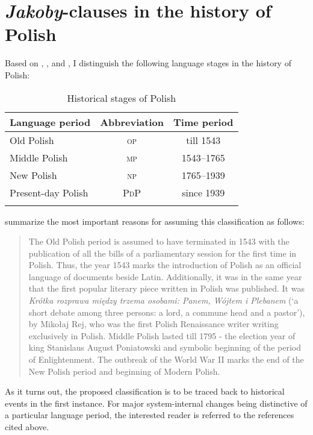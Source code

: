 \documentclass[output=paper
,modfonts
,nonflat]{langsci/langscibook}
\begin{document}
\section{\emph{Jakoby}-clauses in the history of Polish} \label{diachrony} 

Based on \textcite{Klemensiewicz2009}, \textcite{Walczak1999}, and \textcite{Dziubalska-Koaczyk-Walczak2010}, I distinguish the following language stages in the history of Polish: 


\begin{table}[h]
\begin{tabular}{lcc} 
\lsptoprule
Language period & Abbreviation & Time period  \\
\midrule
 Old Polish & \textsc{op} & till 1543 \\
 Middle Polish & \textsc{mp} & 1543--1765  \\
 New Polish & \textsc{np} & 1765--1939 \\
 Present-day Polish & \textsc{PdP} & since 1939 \\ 
\lspbottomrule
\end{tabular}
\caption{Historical stages of Polish}
\end{table}

\noindent \textcite[823]{Dziubalska-Koaczyk-Walczak2010} summarize the most important reasons for assuming this classification as follows:

\begin{quote}
The Old Polish period is assumed to have terminated in 1543 with the publication of all the bills of a parliamentary session for the first time in Polish. Thus, the year 1543 marks the introduction of Polish as an official language of documents beside Latin. Additionally, it was in the same year that the first popular literary piece written in Polish was published. It was \emph{Krótka rozprawa między trzema osobami: Panem, Wójtem i Plebanem} (`a short debate among three persons: a lord, a commune head and a pastor'), by Mikołaj Rej, who was the first Polish Renaissance writer writing exclusively in Polish. Middle Polish lasted till 1795 - the election year of king Stanislaus August Poniatowski and symbolic beginning of the period of Enlightenment. The outbreak of the World War II marks the end of the New Polish period and beginning of Modern Polish.
\end{quote}

\noindent As it turns out, the proposed classification is to be traced back to historical events in the first instance. For major system-internal changes being distinctive of a particular language period, the interested reader is referred to the references cited above. 
\end{document}
